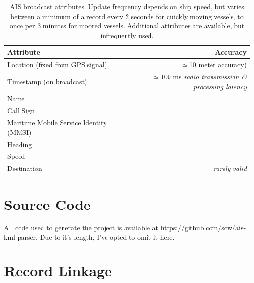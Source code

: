 
\begin{table}[htbp]
  \begin{tabular}{lr}
    Attribute & Accuracy \\
    \hline
    Location (fixed from GPS signal) & $\simeq$10 meter accuracy) \\
    Timestamp (on broadcast) & $\simeq$100 ms \textit{radio transmission \& processing latency}\\
    Name \\
    Call Sign \\
    Maritime Mobile Service Identity (MMSI) \\
    Heading \\
    Speed \\
    Destination & \textit{rarely valid}
  \end{tabular}
  \caption{AIS broadcast attributes. Update frequency depends on ship speed, but varies between a minimum of a record every 2 seconds for quickly moving vessels, to once per 3 minutes for moored vessels. Additional attributes are available, but infrequently used.}
  \label{table:ais-broadcast-attributes}
\end{table}

\newpage
\section{Source Code}
\label{sec:source-code}


All code used to generate the project is available at https://github.com/scw/ais-kml-parser. Due to it's length, I've opted to omit it here.



\section{Record Linkage}
\label{sec:record-linkage-appendix}

